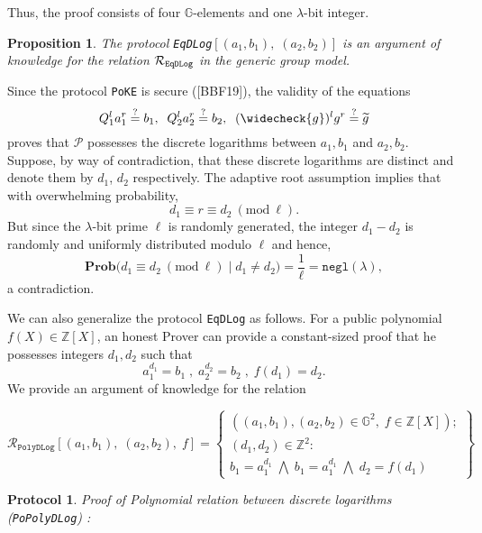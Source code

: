 \documentclass[11pt, lettersize, notitlepage, leqno, footskip=0.6cm]{article}
\newcommand{\bz}{\mathbb Z}
\newcommand{\ttt}{\texttt}
\newcommand{\negl}{\ttt{{negl}}}
\newcommand{\wti}{\widetilde}
\newcommand{\mc}{\mathcal}
\newcommand{\mb}{\mathbb}
\newcommand{\mbf}{\mathbf}
\newcommand{\lam}{\lambda}
\newcommand{\lamb}{\lambda}
\newcommand{\weck}{\widecheck}
\newcommand{\Prob}{\mbf{Prob}}
\newcommand{\vs}{\vspace{-0.15cm}}
\newcommand{\noin}{\noindent}
\newcommand{\op}{overwhelming probability}
\newcommand{\Mod}[1]{\ (\mathrm{mod}\ #1)}
\newtheorem{Prop}[Thm]{Proposition}
\newtheorem{Prot}[Thm]{Protocol}
\numberwithin{equation}{section}
\begin{document}
\noin Thus, the proof consists of four $\mb{G}$-elements and one $\lam$-bit integer. 

\begin{Prop} The protocol \verb|EqDLog|$[(a_1, b_1),\; (a_2, b_2)]$ is an argument of knowledge for the relation $\mc{R}_{{\tt{{EqDLog}}}}$ in the generic group model.\end{Prop}

\begin{prf} Since the protocol \verb|PoKE| is secure ([BBF19]), the validity of the equations \vs $$Q_1^la_1^r \stackrel{?}{=}  b_1, \;\; Q_2^la_2^r \stackrel{?}{=} b_2, \;\; (\weck{g})^l g^r \stackrel{?}{=} \wti{g}$$ proves that $\mc{P}$ possesses the discrete logarithms between $a_1, b_1$ and $a_2, b_2$. Suppose, by way of contradiction, that these discrete logarithms are distinct and denote them by $d_1$, $d_2$ respectively. The adaptive root assumption implies that with \op,\vs $$d_1 \equiv r\equiv d_2 \Mod{\ell}.$$ But since the $\lamb$-bit prime $\ell$ is randomly generated, the integer $d_1-d_2$ is randomly and uniformly distributed modulo $\ell$ and hence, \vs $$ \Prob\big( d_1\equiv d_2\Mod{\ell}\; \Big|\; d_1\neq d_2    \big) = \frac{1}{\ell} =\negl(\lamb),$$ a contradiction.\end{prf}

\vspace{0.2cm}



\noindent We can also generalize the protocol \verb|EqDLog| as follows. For a public polynomial {$f(X)\in \bz[X]$}, an honest Prover can provide a constant-sized proof that he possesses integers $d_1,d_2$ such that \vs $$a_1^{d_1} = b_1\;,\;a_2^{d_2} = b_2\;,\;f(d_1) = d_2.$$ We provide an argument of knowledge for the relation 

\[
  \mc{R}_{{\ttt{PolyDLog}}}[(a_1, b_1),\;(a_2,b_2),\;f] = \left\{\begin{array}{l}
    ((a_1, b_1), (a_2,b_2)\in\mb{G}^2,\;f\in\bz[X]);\\
    (d_1, d_2)\in\mb{Z}^2: \\
    b_1 = a_1^{d_1}\; \bigwedge\; b_1 = a_1^{d_1}\; \bigwedge \;d_2 = f(d_1)
  \end{array}\right\}
\] 

\vspace{0.1cm}


\begin{Prot} \normalfont \textit{Proof of Polynomial relation between discrete logarithms} (\verb|PoPolyDLog|) :\end{Prot} \vspace{-0.3cm}
\end{document}
